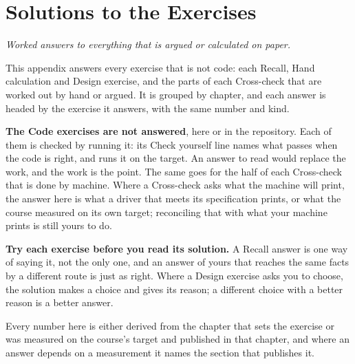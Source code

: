 %

\chapter{Solutions to the Exercises}
\label{sol:ch:solutions}

{\large\itshape Worked answers to everything that is argued or calculated on paper.\par}

This appendix answers every exercise that is not code: each Recall, Hand calculation and Design
exercise, and the parts of each Cross-check that are worked out by hand or argued. It is grouped by
chapter, and each answer is headed by the exercise it answers, with the same number and kind.

\textbf{The Code exercises are not answered}, here or in the repository. Each of them is checked by
running it: its Check yourself line names what passes when the code is right, and 
runs it on the target. An answer to read would replace the work, and the work is the point. The
same goes for the half of each Cross-check that is done by machine. Where a Cross-check asks what
the machine will print, the answer here is what a driver that meets its specification prints, or
what the course measured on its own target; reconciling that with what your machine prints is
still yours to do.

\textbf{Try each exercise before you read its solution.} A Recall answer is one way of saying it,
not the only one, and an answer of yours that reaches the same facts by a different route is just
as right. Where a Design exercise asks you to choose, the solution makes a choice and gives its
reason; a different choice with a better reason is a better answer.

Every number here is either derived from the chapter that sets the exercise or was measured on the
course's target and published in that chapter, and where an answer depends on a measurement it
names the section that publishes it.













